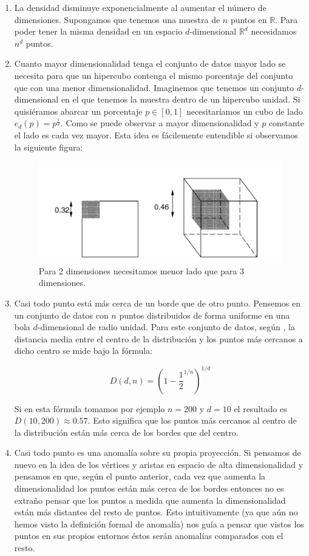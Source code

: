 \begin{enumerate}
	\item La densidad disminuye exponencialmente al aumentar el número de dimensiones. Supongamos que tenemos una muestra de $n$ puntos en $\mathbb{R}$. Para poder tener la misma densidad en un espacio $d$-dimensional $\mathbb{R}^d$ necesidamos $n^d$ puntos.
	\item Cuanto mayor dimensionalidad tenga el conjunto de datos mayor lado se necesita para que un hipercubo contenga el mismo porcentaje del conjunto que con una menor dimensionalidad. Imaginemos que tenemos un conjunto $d$-dimensional en el que tenemos la muestra dentro de un hipercubo unidad. Si quisiéramos abarcar un porcentaje $p\in [0,1]$ necesitaríamos un cubo de lado $e_d (p) = p^{\frac{1}{d}}$. Como se puede observar a mayor dimensionalidad y $p$ constante el lado es cada vez mayor. Esta idea es fácilemente entendible si observamos la siguiente figura:
	
	\begin{figure}[H]
		\centering
		\label{radio_alta_dimensionalidad}
		\includegraphics[scale=0.6]{imagenes/radio_alta_dimensionalidad}
		\caption{Para 2 dimensiones necesitamos menor lado que para 3 dimensiones. \cite[p.~64]{cherkassky_learning_2007}}
	\end{figure}
	\item Casi todo punto está más cerca de un borde que de otro punto. Pensemos en un conjunto de datos con $n$ puntos distribuidos de forma uniforme en una bola $d$-dimensional de radio unidad. Para este conjunto de datos, según \cite{hastie_t._elements_nodate}, la distancia media entre el centro de la distribución y los puntos más cercanos a dicho centro se mide bajo la fórmula:
	
	$$D(d,n) = (1-\frac{1}{2}^{1/n})^{1/d}$$
	
	Si en esta fórmula tomamos por ejemplo $n=200$ y $d=10$ el resultado es $D(10,200) \approx 0.57$. Esto significa que los puntos más cercanos al centro de la distribución están más cerca de los bordes que del centro.
	\item Casi todo punto es una anomalía sobre su propia proyección. Si pensamos de nuevo en la idea de los vértices y aristas en espacio de alta dimensionalidad y pensamos en que, según el punto anterior, cada vez que aumenta la dimensionalidad los puntos están más cerca de los bordes entonces no es extraño pensar que los puntos a medida que aumenta la dimensionalidad están más distantes del resto de puntos. Esto intuitivamente (ya que aún no hemos visto la definición formal de anomalía) nos guía a pensar que vistos los puntos en sus propios entornos éstos serán anomalías comparados con el resto.
	

\end{enumerate}
